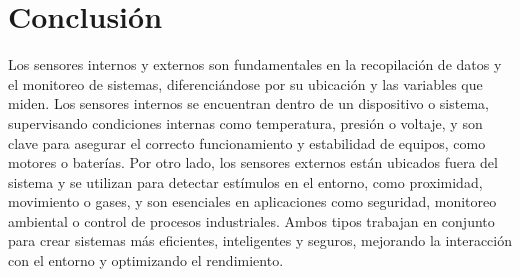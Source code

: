 \section{Conclusión} \label{sec:conclusion}
Los sensores internos y externos son fundamentales en la recopilación de datos y el monitoreo de sistemas, diferenciándose por su ubicación y las variables que miden. Los sensores internos se encuentran dentro de un dispositivo o sistema, supervisando condiciones internas como temperatura, presión o voltaje, y son clave para asegurar el correcto funcionamiento y estabilidad de equipos, como motores o baterías. Por otro lado, los sensores externos están ubicados fuera del sistema y se utilizan para detectar estímulos en el entorno, como proximidad, movimiento o gases, y son esenciales en aplicaciones como seguridad, monitoreo ambiental o control de procesos industriales. Ambos tipos trabajan en conjunto para crear sistemas más eficientes, inteligentes y seguros, mejorando la interacción con el entorno y optimizando el rendimiento.

